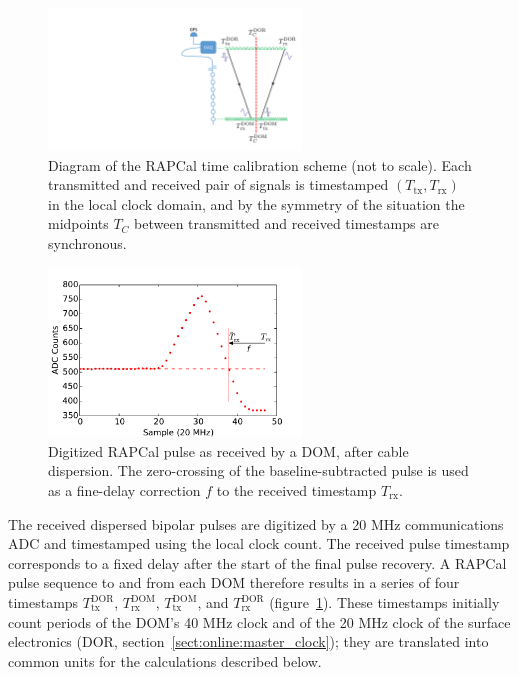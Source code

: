 \begin{figure}[!h]
 \centering
 \includegraphics[width=0.6\textwidth]{graphics/dom/rapcal/rapcal_symmetry.pdf}
 \caption{Diagram of the RAPCal time calibration scheme (not to scale).
   Each transmitted and received pair of signals is
   timestamped $(T_{\mathrm{tx}},T_{\mathrm{rx}})$ in the local clock domain, and by the symmetry of the
   situation the midpoints $T_C$ between transmitted and received timestamps are
   synchronous.} 
 \label{fig:rapcal_symmetry}
\end{figure}

\begin{figure}[h]
 \centering
 \includegraphics[width=0.6\textwidth]{graphics/dom/rapcal/dom_wf_zero_crossing.pdf}
 \caption{Digitized RAPCal pulse as received by a DOM, after cable dispersion.  The
   zero-crossing of the baseline-subtracted pulse is used as a fine-delay
   correction $f$ to the received timestamp $T_{\mathrm{rx}}$.}
 \label{fig:rapcal_zero_crossing}
\end{figure}

The received dispersed bipolar pulses are digitized by a 20 MHz communications ADC and 
timestamped using the local clock count.  The received pulse timestamp
corresponds to a fixed delay after the start of the final pulse recovery.  A RAPCal pulse sequence to and
from each DOM therefore results in a series of four timestamps 
$T_{\mathrm{tx}}^{\mathrm{DOR}}$, $T_{\mathrm{rx}}^{\mathrm{DOM}}$, 
$T_{\mathrm{tx}}^{\mathrm{DOM}}$,  and $T_{\mathrm{rx}}^{\mathrm{DOR}}$
(figure~\ref{fig:rapcal_symmetry}).  These timestamps initially count periods
of the DOM's 40 MHz clock and of the 20 MHz clock of the surface
electronics (DOR, section~\ref{sect:online:master_clock}); they are
translated into common units for the calculations described below.

